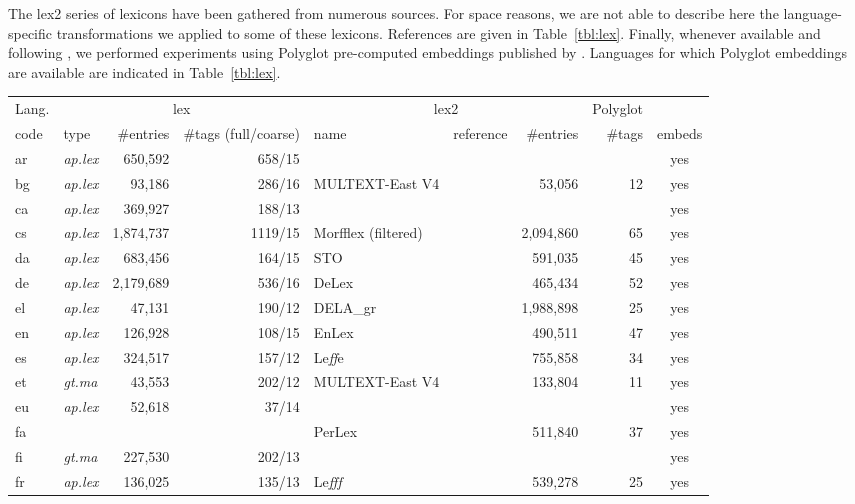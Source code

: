 \documentclass[11pt,letterpaper]{article}
\begin{document}
The {\sc lex2} series of lexicons have been gathered from numerous sources. For space reasons, we are not able to describe
here the language-specific transformations we applied to some of these lexicons. References are given in
Table~\ref{tbl:lex}. 
Finally, whenever available and following \citet{plank16}, we performed experiments using Polyglot pre-computed
embeddings published by \citet{alrfou13}. Languages for which Polyglot embeddings are available are indicated in Table~\ref{tbl:lex}.

\begin{table}
\centering
\scriptsize
\begin{tabular}{l|lrr|llrrc}
\toprule
Lang. & \multicolumn{3}{c}{\sc lex} & \multicolumn{3}{|c}{\sc lex2} & Polyglot\\
code & type & \#entries & \#tags (full/coarse) & name & reference & \#entries & \#tags & embeds\\
\midrule
ar & {\em ap.lex} & 650,592 & 658/15 &  &  &  &  & yes\\
bg & {\em ap.lex} & 93,186 & 286/16 & MULTEXT-East V4 & \citep{erjavec10} & 53,056 & 12 & yes\\
ca & {\em ap.lex} & 369,927 & 188/13 &  &  &  &  & yes\\
cs & {\em ap.lex} & 1,874,737 & 1119/15 & Morfflex (filtered) & \citep{hajic13} & 2,094,860 & 65 & yes\\
da & {\em ap.lex} & 683,456 & 164/15 & STO & \citep{braasch08} & 591,035 & 45 & yes\\
de & {\em ap.lex} & 2,179,689 & 536/16 & DeLex & \citep{sagot14delex} & 465,434 & 52 & yes\\
el & {\em ap.lex} & 47,131 & 190/12 & DELA\_gr & \citep{symeonidis99} & 1,988,898 & 25 & yes\\
en & {\em ap.lex} & 126,928 & 108/15 & EnLex & \citep{sagot10lefff} & 490,511 & 47 & yes\\
es & {\em ap.lex} & 324,517 & 157/12 & Le{\it ff}e & \citep{molinero09} & 755,858 & 34 & yes\\
et & {\em gt.ma} & 43,553 & 202/12 & MULTEXT-East V4 & \citep{erjavec10} & 133,804 & 11 & yes\\
eu & {\em ap.lex} & 52,618 & 37/14 &  &  &  &  & yes\\
fa &  &  &  & PerLex & \citep{sagot10perlex} & 511,840 & 37 & yes\\
fi & {\em gt.ma} & 227,530 & 202/13 &  &  &  &  & yes\\
fr & {\em ap.lex} & 136,025 & 135/13 & Le{\it fff} & \citep{sagot10lefff} & 539,278 & 25 & yes\\

\end{tabular}
\end{table}
\end{document}
